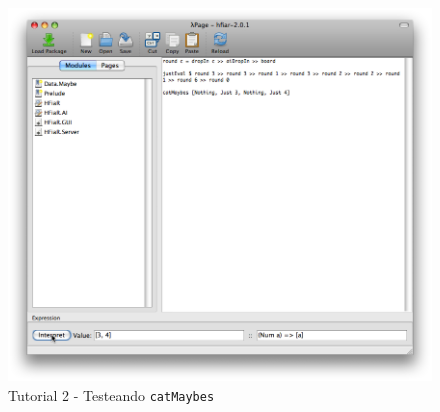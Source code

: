 \documentclass[a4paper]{article}
\begin{document}
\begin{figure}[hp]
	\begin{center}
        	\includegraphics[width=.75\textwidth]{pictures/tut2/10}
		\caption{Tutorial 2 - Testeando \texttt{catMaybes}}
		\label{tut210}
	\end{center}
\end{figure}

\newpage
\end{document}

